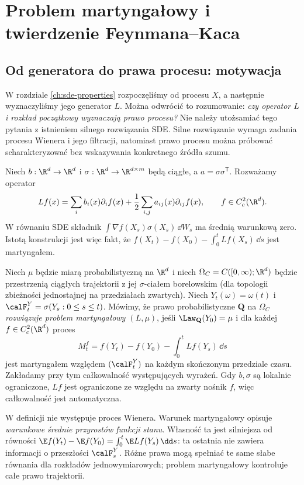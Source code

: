 \chapter{Problem martyngałowy i twierdzenie Feynmana--Kaca}
\label{ch:martingale-fk}

\section{Od generatora do prawa procesu: motywacja}

W rozdziale \ref{ch:sde-properties} rozpoczęliśmy od procesu $X$, a następnie
wyznaczyliśmy jego generator $L$. Można odwrócić to rozumowanie:
\emph{czy operator $L$ i rozkład początkowy wyznaczają prawo procesu?}
Nie należy utożsamiać tego pytania z istnieniem silnego rozwiązania SDE.
Silne rozwiązanie wymaga zadania procesu Wienera i jego filtracji,
natomiast prawo procesu można próbować scharakteryzować bez wskazywania
konkretnego źródła szumu.

Niech $b:\R^d\to\R^d$ i $\sigma:\R^d\to\R^{d\times m}$ będą
ciągłe, a $a=\sigma\sigma^{\mathsf T}$. Rozważamy operator
\[
Lf(x)=\sum_i b_i(x)\partial_i f(x)
 +\frac12\sum_{i,j}a_{ij}(x)\partial_{ij}f(x),
 \qquad f\in C_c^2(\R^d).
\]
W równaniu SDE składnik $\int\nabla f(X_s)\sigma(X_s)\,\dd W_s$
ma średnią warunkową zero. Istotą konstrukcji jest więc fakt, że
$f(X_t)-f(X_0)-\int_0^tLf(X_s)\,\dd s$ jest martyngałem.

\begin{definicja}
\label{def:mp}
Niech $\mu$ będzie miarą probabilistyczną na $\R^d$ i niech
$\Omega_C=C([0,\infty);\R^d)$ będzie przestrzenią ciągłych trajektorii
z jej $\sigma$-ciałem borelowskim (dla topologii zbieżności jednostajnej
na przedziałach zwartych). Niech $Y_t(\omega)=\omega(t)$ i
$\calF_t^Y=\sigma(Y_s:0\le s\le t)$.
Mówimy, że prawo probabilistyczne $\mathbf Q$ na $\Omega_C$
\emph{rozwiązuje problem martyngałowy $(L,\mu)$}, jeśli
$\Law_{\mathbf Q}(Y_0)=\mu$ i dla każdej $f\in C_c^2(\R^d)$
proces
\[
M_t^f=f(Y_t)-f(Y_0)-\int_0^tLf(Y_s)\,\dd s
\]
jest martyngałem względem $(\calF_t^Y)$ na każdym skończonym
przedziale czasu. Zakładamy przy tym całkowalność występujących
wyrażeń. Gdy $b,\sigma$ są lokalnie ograniczone, $Lf$ jest ograniczone
ze względu na zwarty nośnik $f$, więc całkowalność jest automatyczna.
\end{definicja}

\begin{uwaga}
W definicji nie występuje proces Wienera. Warunek
martyngałowy opisuje \emph{warunkowe średnie przyrostów funkcji
stanu}. Własność ta jest silniejsza od równości
$\E f(Y_t)-\E f(Y_0)=\int_0^t\E Lf(Y_s)\,\dd s$:
ta ostatnia nie zawiera informacji o przeszłości $\calF_s^Y$.
Różne prawa mogą spełniać te same słabe równania dla rozkładów
jednowymiarowych; problem martyngałowy kontroluje całe prawo trajektorii.
\end{uwaga}

